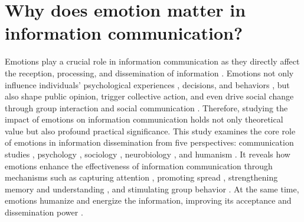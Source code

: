 \section{Why does emotion matter in information communication?} \label{sec:why} %

Emotions play a crucial role in information communication as they directly affect the reception, processing, and dissemination of information \cite{ferrara2015measuring, berger2012makes}. Emotions not only influence individuals’ psychological experiences \cite{jimenez2012emotional, lopez2021translating, berger2012makes, stieglitz2013emotions}, decisions, and behaviors \cite{schreiner2021impact, de2021sadness}, but also shape public opinion, trigger collective action, and even drive social change through group interaction and social communication \cite{stieglitz2013emotions, ferrara2015measuring, son2022emotion}. Therefore, studying the impact of emotions on information communication holds not only theoretical value but also profound practical significance. This study examines the core role of emotions in information dissemination from five perspectives: communication studies \cite{tyng2017influences, schreiner2021impact, ferrara2015measuring, berger2012makes, vosoughi2018spread}, psychology \cite{mather2011arousal, hanson2014happy, jimenez2012emotional}, sociology \cite{sanford2004negative}, neurobiology \cite{phelps2004human, mcgaugh2015consolidating}, and humanism \cite{dykas2011attachment, stieglitz2013emotions, van2020seeking, dubey2020psychosocial}. It reveals how emotions enhance the effectiveness of information communication through mechanisms such as capturing attention \cite{egidi2012emotional, tyng2017influences}, promoting spread \cite{schreiner2021impact, ferrara2015measuring, berger2012makes, stieglitz2013emotions}, strengthening memory and understanding \cite{pawlowska2011influence, megalakaki2019effects, hanson2014happy, kensinger2007negative, kensinger2020retrieval, van2015good}, and stimulating group behavior \cite{ferrara2015measuring, son2022emotion, berger2012makes, de2021sadness}. At the same time, emotions humanize and energize the information, improving its acceptance and dissemination power \cite{dykas2011attachment, van2020seeking, dubey2020psychosocial}.

